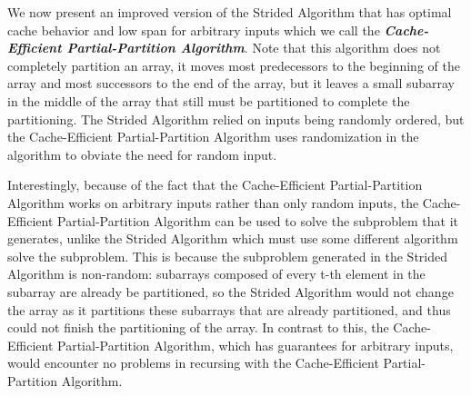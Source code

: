 \documentclass[sigconf]{acmart}
\newcommand{\defn}[1]       {{\textit{\textbf{\boldmath #1}}}}
\renewcommand{\paragraph}[1]{\vspace{0.09in}\noindent{\bf \boldmath #1.}}
\theoremstyle{remark}
\theoremstyle{remark}
\begin{document}
\paragraph{Algorithm Concept}
We now present an improved version of the Strided Algorithm that has optimal cache behavior and low span for arbitrary inputs which we call the \defn{Cache-Efficient Partial-Partition Algorithm}. 
Note that this algorithm does not completely partition an array, it moves most predecessors to the beginning of the array and most successors to the end of the array, but it leaves a small subarray in the middle of the array that still must be partitioned to complete the partitioning.
The Strided Algorithm relied on inputs being randomly ordered, but the Cache-Efficient Partial-Partition Algorithm uses randomization in the algorithm to obviate the need for random input. 

Interestingly, because of the fact that the Cache-Efficient Partial-Partition Algorithm works on arbitrary inputs rather than only random inputs, the Cache-Efficient Partial-Partition Algorithm can be used to solve the subproblem that it generates, unlike the Strided Algorithm which must use some different algorithm solve the subproblem.
This is because the subproblem generated in the Strided Algorithm is non-random: subarrays composed of every t-th element in the subarray are already be partitioned, so the Strided Algorithm would not change the array as it partitions these subarrays that are already partitioned, and thus could not finish the partitioning of the array.
In contrast to this, the Cache-Efficient Partial-Partition Algorithm, which has guarantees for arbitrary inputs, would encounter no problems in recursing with the Cache-Efficient Partial-Partition Algorithm.
\end{document}
